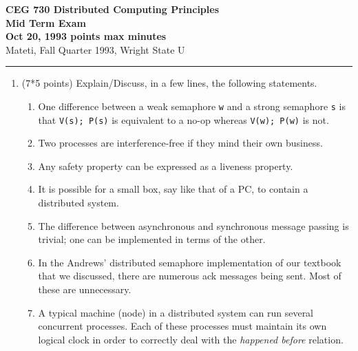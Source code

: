\def\fat{\framebox[1mm]{\rule{0mm}{2mm}}}
\def\pr{$\parallel$}
\def\CSP{{\sc csp}}
\def\RPC{{\sc rpc}}
\def\co{{\bf co}}
\def\oc{{\bf oc}}
\def\pa{{$\parallel$}}
\def\lb{$\langle$}
\def\rb{$\rangle$}
\def\ra{$\rightarrow$}
\def\await{{\bf await}}

\parindent=0pt



{\bf CEG 
\large \bf 730 Distributed Computing Principles\\[5pt]
\large Mid Term Exam\\[10pt]
Oct 20, 1993  points max  minutes\\
}
\bigskip
{Mateti,  Fall Quarter 1993, Wright State U}\\[-5pt]
\hrule

\begin{enumerate}

\item (7*5 points)
Explain/Discuss, in a few lines, the following statements.

\begin{enumerate}

\item One difference between a weak semaphore {\tt w} and a strong
semaphore {\tt s} is that {\tt V(s); P(s)} is equivalent to a no-op
whereas {\tt V(w); P(w)} is not.

\item Two processes are interference-free if they mind their
own business.

\item
Any safety property can be expressed as a liveness property.

\item It is possible for a small box, say like that of a PC, to
contain a distributed system.

\item
The difference between asynchronous and synchronous message passing is
trivial; one can be implemented in terms of the other.


\item
In the Andrews' distributed semaphore implementation of our textbook
that we discussed, there are numerous {\sc ack} messages being sent.
Most of these are unnecessary.

\item
A typical machine (node) in a distributed system can run several
concurrent processes.  Each of these processes must maintain its own
logical clock in order to correctly deal with the {\sl happened
before} relation.


\end{enumerate}
\end{enumerate}
